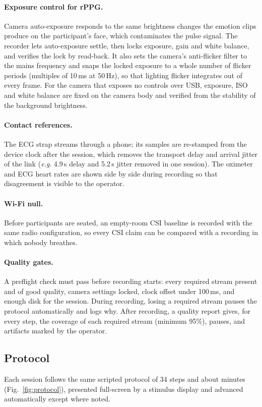 \documentclass[10pt,twocolumn,letterpaper]{article}
\newcommand{\ph}[1]{\textbf{\fbox{UNFILLED: #1}}}
\newcommand{\ph}[1]{{\color{red}\texttt{[#1]}}}
\providecommand{\eg}{\textit{e.g}.\xspace}
\begin{document}
\paragraph{Exposure control for rPPG.} Camera auto-exposure responds to the same brightness changes the emotion
clips produce on the participant's face, which contaminates the pulse signal. The recorder lets auto-exposure
settle, then locks exposure, gain and white balance, and verifies the lock by read-back. It also sets the camera's
anti-flicker filter to the mains frequency and snaps the locked exposure to a whole number of flicker periods
(multiples of 10\,ms at 50\,Hz), so that lighting flicker integrates out of every frame. For the camera that
exposes no controls over USB, exposure, ISO and white balance are fixed on the camera body and verified from the
stability of the background brightness.

\paragraph{Contact references.} The ECG strap streams through a phone; its samples are re-stamped from the device
clock after the session, which removes the transport delay and arrival jitter of the link (\eg 4.9\,s delay and
5.2\,s jitter removed in one session). The oximeter and ECG heart rates are shown side by side during recording so
that disagreement is visible to the operator.

\paragraph{Wi-Fi null.} Before participants are seated, an empty-room CSI baseline is recorded with the same radio
configuration, so every CSI claim can be compared with a recording in which nobody breathes.

\paragraph{Quality gates.} A preflight check must pass before recording starts: every required stream present and
of good quality, camera settings locked, clock offset under 100\,ms, and enough disk for the session. During
recording, losing a required stream pauses the protocol automatically and logs why. After recording, a quality report
gives, for every step, the coverage of each required stream (minimum 95\%), pauses, and artifacts marked by the
operator.

\subsection{Protocol}\label{sec:protocol}
Each session follows the same scripted protocol of 34 steps and about \ph{37} minutes (Fig.~\ref{fig:protocol}),
presented full-screen by a stimulus display and advanced automatically except where noted.
\end{document}

